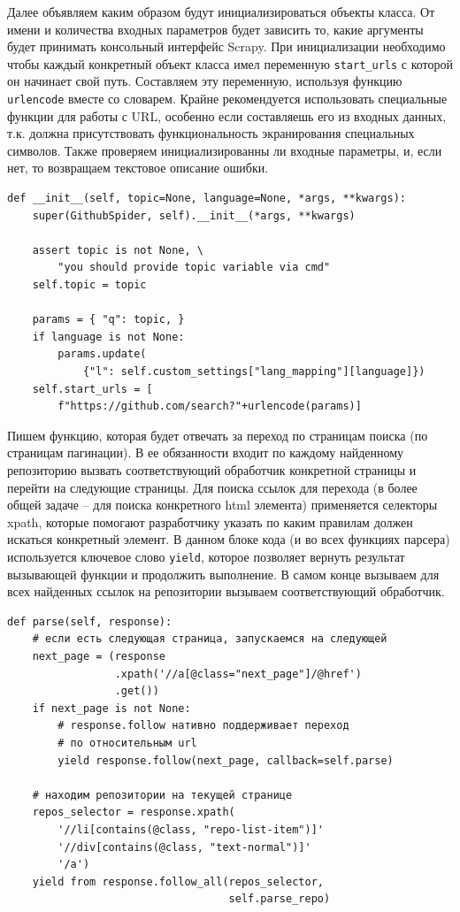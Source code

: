 Далее объявляем каким образом будут инициализироваться объекты класса. От имени
и количества входных параметров будет зависить то, какие аргументы будет
принимать консольный интерфейс Scrapy. При инициализации необходимо чтобы каждый
конкретный объект класса имел переменную \verb|start_urls| с которой он начинает
свой путь. Составляем эту переменную, используя функцию \verb|urlencode| вместе
со словарем. Крайне рекомендуется использовать специальные функции для работы с
URL, особенно если составляешь его из входных данных, т.к. должна присутствовать
функциональность экранирования специальных символов. Также проверяем
инициализированны ли входные параметры, и, если нет, то возвращаем текстовое
описание ошибки.
\begin{verbatim}
def __init__(self, topic=None, language=None, *args, **kwargs):
    super(GithubSpider, self).__init__(*args, **kwargs)

    assert topic is not None, \
        "you should provide topic variable via cmd"
    self.topic = topic

    params = { "q": topic, }
    if language is not None:
        params.update(
            {"l": self.custom_settings["lang_mapping"][language]})
    self.start_urls = [
        f"https://github.com/search?"+urlencode(params)]
\end{verbatim}

Пишем функцию, которая будет отвечать за переход по страницам поиска (по
страницам пагинации). В ее обязанности входит по каждому найденному репозиторию
вызвать соответствующий обработчик конкретной страницы и перейти на следующие
страницы. Для поиска ссылок для перехода (в более общей задаче -- для поиска
конкретного html элемента) применяется селекторы xpath, которые помогают
разработчику указать по каким правилам должен искаться конкретный элемент. В
данном блоке кода (и во всех функциях парсера) используется ключевое слово
\verb|yield|, которое позволяет вернуть результат вызывающей функции и
продолжить выполнение. В самом конце вызываем для всех найденных ссылок на
репозитории вызываем соответствующий обработчик.
\begin{verbatim}
def parse(self, response):
    # если есть следующая страница, запускаемся на следующей
    next_page = (response
                 .xpath('//a[@class="next_page"]/@href')
                 .get())
    if next_page is not None:
        # response.follow нативно поддерживает переход
        # по относительным url
        yield response.follow(next_page, callback=self.parse)

    # находим репозитории на текущей странице
    repos_selector = response.xpath(
        '//li[contains(@class, "repo-list-item")]'
        '//div[contains(@class, "text-normal")]'
        '/a')
    yield from response.follow_all(repos_selector,
                                   self.parse_repo)
\end{verbatim}


